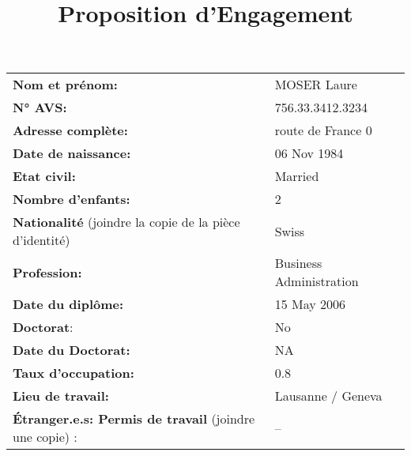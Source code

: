 \documentclass[
]{article}
\title{Proposition d'Engagement}
\author{}
\date{\vspace{-2.5em}}
\begin{document}
\maketitle

\begin{longtable}[]{@{}ll@{}}
\toprule
\endhead
\textbf{Nom et prénom:} & MOSER Laure\tabularnewline
\textbf{N° AVS:} & 756.33.3412.3234\tabularnewline
\textbf{Adresse complète:} & route de France 0\tabularnewline
\textbf{Date de naissance:} & 06 Nov 1984\tabularnewline
\textbf{Etat civil:} & Married\tabularnewline
\textbf{Nombre d'enfants:} & 2\tabularnewline
\textbf{Nationalité} (joindre la copie de la pièce d'identité) &
Swiss\tabularnewline
\textbf{Profession:} & Business Administration\tabularnewline
\textbf{Date du diplôme:} & 15 May 2006\tabularnewline
\textbf{Doctorat}: & No\tabularnewline
\textbf{Date du Doctorat:} & NA\tabularnewline
\textbf{Taux d'occupation:} & 0.8\tabularnewline
\textbf{Lieu de travail:} & Lausanne / Geneva\tabularnewline
\textbf{Étranger.e.s: Permis de travail} (joindre une copie) : &
--\tabularnewline
\bottomrule
\end{longtable}
\end{document}

